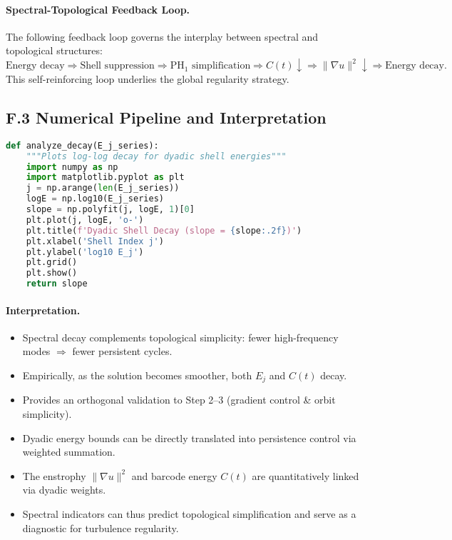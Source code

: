 \documentclass[11pt]{article}
\theoremstyle{definition}
\begin{document}
\paragraph{Spectral-Topological Feedback Loop.} The following feedback loop governs the interplay between spectral and topological structures:
\[ 
\text{Energy decay} \Rightarrow \text{Shell suppression} \Rightarrow \mathrm{PH}_1 \text{ simplification} \Rightarrow C(t) \downarrow \Rightarrow \|\nabla u\|^2 \downarrow \Rightarrow \text{Energy decay}.
\]
This self-reinforcing loop underlies the global regularity strategy.

\subsection*{F.3 Numerical Pipeline and Interpretation}

\begin{lstlisting}[language=Python]
def analyze_decay(E_j_series):
    """Plots log-log decay for dyadic shell energies"""
    import numpy as np
    import matplotlib.pyplot as plt
    j = np.arange(len(E_j_series))
    logE = np.log10(E_j_series)
    slope = np.polyfit(j, logE, 1)[0]
    plt.plot(j, logE, 'o-')
    plt.title(f'Dyadic Shell Decay (slope = {slope:.2f})')
    plt.xlabel('Shell Index j')
    plt.ylabel('log10 E_j')
    plt.grid()
    plt.show()
    return slope
\end{lstlisting}

\paragraph{Interpretation.}
\begin{itemize}
  \item Spectral decay complements topological simplicity: fewer high-frequency modes \(\Rightarrow\) fewer persistent cycles.
  \item Empirically, as the solution becomes smoother, both \( E_j \) and \( C(t) \) decay.
  \item Provides an orthogonal validation to Step 2--3 (gradient control \& orbit simplicity).
  \item Dyadic energy bounds can be directly translated into persistence control via weighted summation.
  \item The enstrophy \( \|\nabla u\|^2 \) and barcode energy \( C(t) \) are quantitatively linked via dyadic weights.
  \item Spectral indicators can thus predict topological simplification and serve as a diagnostic for turbulence regularity.
\end{itemize}
\end{document}
